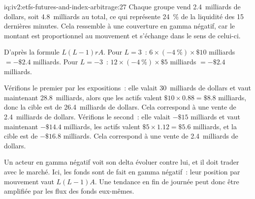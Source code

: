 \begin{solution}{iq:iv2:etfs-futures-and-index-arbitrage:27}
Chaque groupe vend 2.4~milliards de dollars, soit 4.8~milliards au total, ce qui représente 24~\% de la liquidité des 15 dernières minutes. Cela ressemble à une couverture en gamma négatif, car le montant est proportionnel au mouvement et s'échange dans le sens de celui-ci.

D'après la formule $L(L - 1)rA$. Pour $L = 3$~: $6 \times (-4~\%) \times \$10$ milliards $= -\$2.4$ milliards. Pour $L = -3$~: $12 \times (-4~\%) \times \$5$ milliards $= -\$2.4$ milliards.

Vérifions le premier par les expositions~: elle valait 30~milliards de dollars et vaut maintenant 28.8~milliards, alors que les actifs valent $\$10 \times 0.88 = \$8.8$ milliards, donc la cible est de 26.4~milliards de dollars. Cela correspond à une vente de 2.4~milliards de dollars. Vérifions le second~: elle valait $-\$15$ milliards et vaut maintenant $-\$14.4$ milliards, les actifs valent $\$5 \times 1.12 = \$5.6$ milliards, et la cible est de $-\$16.8$ milliards. Cela correspond à une vente de 2.4~milliards de dollars.

Un acteur en gamma négatif voit son delta évoluer contre lui, et il doit trader avec le marché. Ici, les fonds sont de fait en gamma négatif~: leur position par mouvement vaut $L(L - 1)A$. Une tendance en fin de journée peut donc être amplifiée par les flux des fonds eux-mêmes.

\end{solution}

